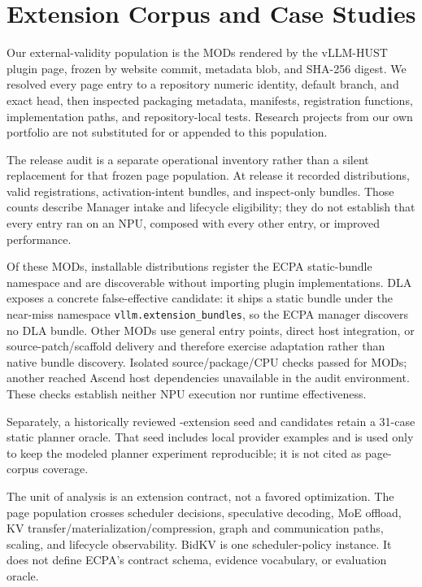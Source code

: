 \documentclass[letterpaper,twocolumn,10pt]{article}
\begin{document}
\section{Extension Corpus and Case Studies}
Our external-validity population is the \ECPAWorkshopMods{} MODs rendered by the
vLLM-HUST plugin page, frozen by website commit, metadata blob, and SHA-256
digest.  We resolved every page entry to a repository numeric identity,
default branch, and exact head, then inspected packaging metadata, manifests,
registration functions, implementation paths, and repository-local tests.
Research projects from our own portfolio are not substituted for or appended
to this population.

The release audit is a separate operational inventory rather than a silent
replacement for that frozen page population.  At release
\ECPAReleaseVersion{} it recorded \ECPAReleaseDistributions{} distributions,
\ECPAReleaseRegistrations{} valid registrations,
\ECPAReleaseActivationIntent{} activation-intent bundles, and
\ECPAReleaseInspectOnly{} inspect-only bundles.  Those counts describe Manager
intake and lifecycle eligibility; they do not establish that every entry ran
on an NPU, composed with every other entry, or improved performance.

Of these MODs, \ECPAWorkshopBundleNamespace{} installable distributions register
the ECPA static-bundle namespace and are discoverable without importing plugin
implementations.  DLA exposes a concrete false-effective candidate: it ships a
static bundle under the near-miss namespace \texttt{vllm.extension\_bundles}, so
the ECPA manager discovers no DLA bundle.  Other MODs use general entry points,
direct host integration, or source-patch/scaffold delivery and therefore
exercise adaptation rather than native bundle discovery.  Isolated
source/package/CPU checks passed for \ECPAWorkshopTestPass{} MODs; another
\ECPAWorkshopEnvironmentBlocked{} reached Ascend host dependencies unavailable
in the audit environment.  These checks establish neither NPU execution nor
runtime effectiveness.

Separately, a historically reviewed \ECPAPlannerSeedExtensions{}-extension seed
and \ECPAAdaptationCandidates{} candidates retain a 31-case static planner
oracle.  That seed includes local provider examples and is used only to keep the
modeled planner experiment reproducible; it is not cited as page-corpus
coverage.

The unit of analysis is an extension contract, not a favored optimization.
The page population crosses scheduler decisions, speculative decoding, MoE
offload, KV transfer/materialization/compression, graph and communication paths,
scaling, and lifecycle observability.  BidKV is
one scheduler-policy instance.  It does
not define ECPA's contract schema, evidence vocabulary, or evaluation oracle.
\end{document}
